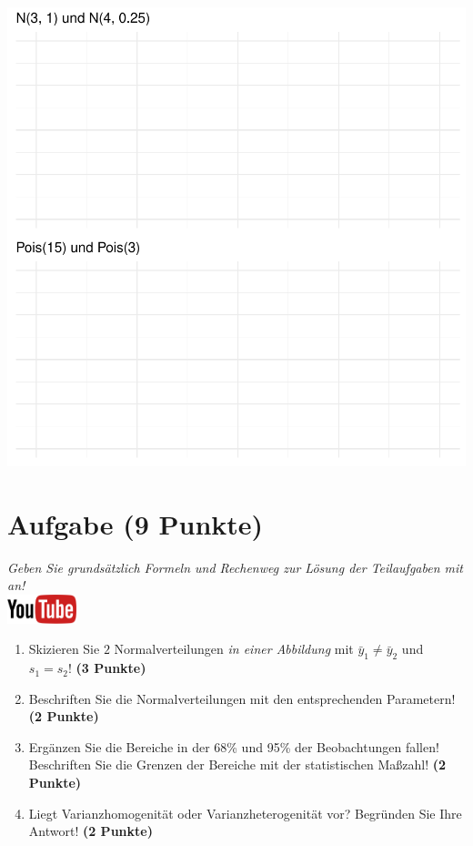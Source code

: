 \documentclass[a4paper, 9pt]{scrartcl}\usepackage[]{graphicx}\usepackage[]{xcolor}
\makeatletter
\def\maxwidth{ %
  \ifdim\Gin@nat@width>\linewidth
    \linewidth
  \else
    \Gin@nat@width
  \fi
}
\makeatother
\begin{document}
{\centering \includegraphics[width=\maxwidth]{img/histogram-01-1} 

}



 
\clearpage

\section{Aufgabe \hfill (9 Punkte)}

\textit{Geben Sie grunds{\"a}tzlich Formeln und Rechenweg zur L{\"o}sung der
  Teilaufgaben mit an!} \\[1Ex]

\hfill\href{https://youtu.be/ZrJhn2wPbq4}{\includegraphics[width =
  2cm]{img/youtube}}\\[1Ex]



\begin{enumerate}
\item Skizieren Sie $2$ Normalverteilungen \textit{in einer
    Abbildung} mit $\bar{y}_1 \neq \bar{y}_2$ und $s_1 = s_2$! \textbf{(3 Punkte)}
\item Beschriften Sie die Normalverteilungen mit den entsprechenden
  Parametern! \textbf{(2 Punkte)}
\item Erg{\"a}nzen Sie die Bereiche in der 68\% und 95\% der Beobachtungen
  fallen! Beschriften Sie die Grenzen der Bereiche mit der statistischen Ma{\ss}zahl! \textbf{(2 Punkte)}
\item Liegt Varianzhomogenit{\"a}t oder Varianzheterogenit{\"a}t vor? Begr{\"u}nden Sie
  Ihre Antwort! \textbf{(2 Punkte)}
\end{enumerate}
\end{document}
